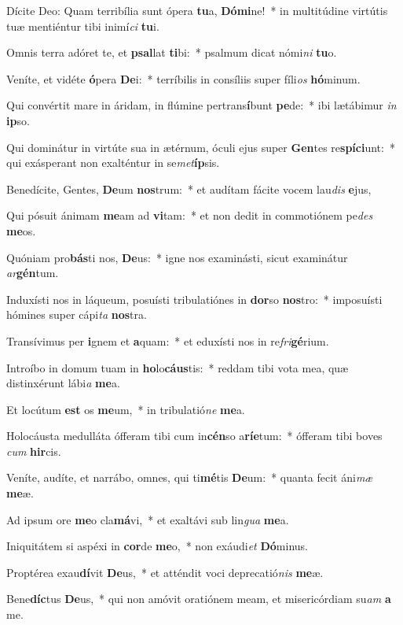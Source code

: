 \item Dícite Deo: Quam terribília sunt ópera \textbf{tu}a, \textbf{Dó}\textbf{mi}ne!~* in multitúdine virtútis tuæ mentiéntur tibi inimí\textit{ci} \textbf{tu}i.
\item Omnis terra adóret te, et \textbf{psal}lat \textbf{ti}bi:~* psalmum dicat nómi\textit{ni} \textbf{tu}o.
\item Veníte, et vidéte \textbf{ó}pera \textbf{De}i:~* terríbilis in consíliis super fíli\textit{os} \textbf{hó}minum.
\item Qui convértit mare in áridam, in flúmine pertrans\textbf{í}bunt \textbf{pe}de:~* ibi lætábimur \textit{in} \textbf{ip}so.
\item Qui dominátur in virtúte sua in ætérnum, óculi ejus super \textbf{Gen}tes re\textbf{spí}\textbf{ci}unt:~* qui exásperant non exalténtur in se\textit{met}\textbf{íp}sis.
\item Benedícite, Gentes, \textbf{De}um \textbf{nos}trum:~* et audítam fácite vocem lau\textit{dis} \textbf{e}jus,
\item Qui pósuit ánimam \textbf{me}am ad \textbf{vi}tam:~* et non dedit in commotiónem pe\textit{des} \textbf{me}os.
\item Quóniam pro\textbf{bás}ti nos, \textbf{De}us:~* igne nos examinásti, sicut examinátur \textit{ar}\textbf{gén}tum.
\item Induxísti nos in láqueum, posuísti tribulatiónes in \textbf{dor}so \textbf{nos}tro:~* imposuísti hómines super cápi\textit{ta} \textbf{nos}tra.
\item Transívimus per \textbf{i}gnem et \textbf{a}quam:~* et eduxísti nos in re\textit{fri}\textbf{gé}rium.
\item Introíbo in domum tuam in \textbf{ho}lo\textbf{cáus}tis:~* reddam tibi vota mea, quæ distinxérunt lábi\textit{a} \textbf{me}a.
\item Et locútum \textbf{est} os \textbf{me}um,~* in tribulatió\textit{ne} \textbf{me}a.
\item Holocáusta medulláta ófferam tibi cum in\textbf{cén}so a\textbf{rí}\textbf{e}tum:~* ófferam tibi boves \textit{cum} \textbf{hir}cis.
\item Veníte, audíte, et narrábo, omnes, qui ti\textbf{mé}tis \textbf{De}um:~* quanta fecit áni\textit{mæ} \textbf{me}æ.
\item Ad ipsum ore \textbf{me}o cla\textbf{má}vi,~* et exaltávi sub lin\textit{gua} \textbf{me}a.
\item Iniquitátem si aspéxi in \textbf{cor}de \textbf{me}o,~* non exáudi\textit{et} \textbf{Dó}minus.
\item Proptérea exau\textbf{dí}vit \textbf{De}us,~* et atténdit voci deprecatió\textit{nis} \textbf{me}æ.
\item Bene\textbf{díc}tus \textbf{De}us,~* qui non amóvit oratiónem meam, et misericórdiam su\textit{am} \textbf{a} me.
